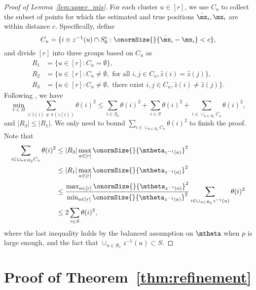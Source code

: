 \documentclass[lettersize,onecolumn,journal]{IEEEtran}
\theoremstyle{definition}
\theoremstyle{definition}
\begin{document}
\begin{proof}[Proof of Lemma~\ref{lem:upper_mis}] 

For each cluster $u\in[r]$, we use $C_u$ to collect the subset of points for which the estimated and true positions $\hat \mx_i, \mx_i$ are within distance $c$. Specifically, define
\begin{equation}
    C_u = \{ i \in z^{-1}(u) \cap S_0^c: \onormSize{}{\hat \mx_i - \mx_i} < c \},
\end{equation}
and divide $[r]$ into three groups based on $C_u$ as 
\begin{align}
    R_1 &= \{ u \in [r]: C_u = \emptyset \},\\
    R_2 &= \{ u \in [r]: C_u \neq \emptyset, \text{ for all } i, j \in C_u, \hat z(i) = \hat z(j) \},\\
    R_3 &= \{ u \in [r]: C_u \neq \emptyset, \text{ there exist } i, j \in C_u, \hat z(i) \neq \hat z(j) \}.
\end{align}
Following \citet[Lemma 6]{gao2018community}, we have 
\begin{equation}
    \min_{\pi \in \Pi} \sum_{i : \hat z(i) \neq \pi(z(i))} \theta(i)^2 \leq \sum_{i \in S_0} \theta(i)^2 + \sum_{i \in S} \theta(i)^2 + \sum_{ i \in \cup_{u \in R_3} C_u} \theta(i)^2,
\end{equation}
and $|R_3| \leq |R_1|$. We only need to bound $\sum_{ i \in \cup_{u \in R_3} C_u} \theta(i)^2$ to finish the proof. Note that 
\begin{align}
    \sum_{ i \in \cup_{u \in R_3} C_u} \theta(i)^2 &\leq |R_3| \max_{a \in [r]} \onormSize{}{\mtheta_{z^{-1}(a)}}^2 \\
    & \leq |R_1| \max_{a \in [r]} \onormSize{}{\mtheta_{z^{-1}(a)}}^2  \\
    & \leq {\max_{a \in [r]} \onormSize{}{\mtheta_{z^{-1}(a)}}^2 \over \min_{a \in [r]} \onormSize{}{\mtheta_{z^{-1}(a)}}^2 } \sum_{i \in \cup_{u \in R_1} z^{-1}(u)} \theta(i)^2\\
    & \leq 2 \sum_{i \in S} \theta(i)^2,
\end{align}
where the last inequality holds by the balanced assumption on $\mtheta$ when $p$ is large enough, and the fact that $ \cup_{u \in R_1} z^{-1}(u) \subset S$.
\end{proof}

\newpage

\section*{Proof of Theorem~\ref{thm:refinement}}
\end{document}
